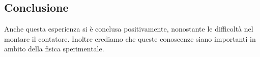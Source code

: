 \subsection{Conclusione}

Anche questa esperienza si è conclusa positivamente, nonostante le difficoltà nel montare il
contatore. Inoltre crediamo che queste conoscenze siano importanti in ambito della fisica sperimentale.

